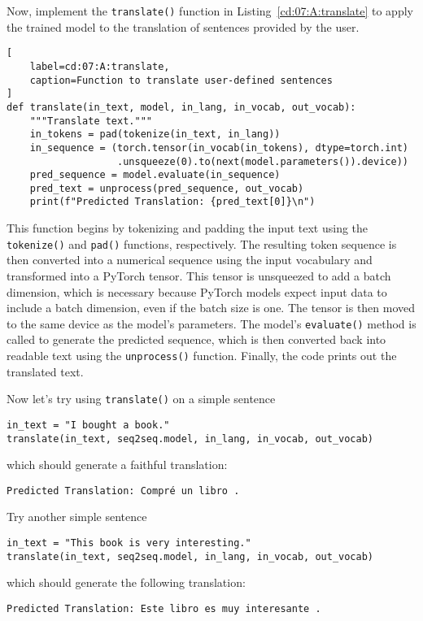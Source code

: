 Now, implement the \lstinline{translate()} function in Listing~\ref{cd:07:A:translate} to apply the trained model to the translation of sentences provided by the user.
\begin{lstlisting}[
    label=cd:07:A:translate,
    caption=Function to translate user-defined sentences
]
def translate(in_text, model, in_lang, in_vocab, out_vocab):
    """Translate text."""
    in_tokens = pad(tokenize(in_text, in_lang))
    in_sequence = (torch.tensor(in_vocab(in_tokens), dtype=torch.int)
                   .unsqueeze(0).to(next(model.parameters()).device))
    pred_sequence = model.evaluate(in_sequence)
    pred_text = unprocess(pred_sequence, out_vocab)
    print(f"Predicted Translation: {pred_text[0]}\n")
\end{lstlisting}
This function begins by tokenizing and padding the input text using the \lstinline{tokenize()} and \lstinline{pad()} functions, respectively. The resulting token sequence is then converted into a numerical sequence using the input vocabulary and transformed into a PyTorch tensor. This tensor is unsqueezed to add a batch dimension, which is necessary because PyTorch models expect input data to include a batch dimension, even if the batch size is one. The tensor is  then moved to the same device as the model's parameters. The model's \lstinline{evaluate()} method is called to generate the predicted sequence, which is then converted back into readable text using the \lstinline{unprocess()} function. Finally, the code prints out the translated text.

Now let's try using \lstinline{translate()} on a simple sentence
\begin{lstlisting}
in_text = "I bought a book."
translate(in_text, seq2seq.model, in_lang, in_vocab, out_vocab)
\end{lstlisting}
which should generate a faithful translation:
\begin{lstlisting}
Predicted Translation: Compré un libro .
\end{lstlisting}

Try another simple sentence
\begin{lstlisting}
in_text = "This book is very interesting."
translate(in_text, seq2seq.model, in_lang, in_vocab, out_vocab)
\end{lstlisting}
which should generate the following translation:
\begin{lstlisting}
Predicted Translation: Este libro es muy interesante .
\end{lstlisting}


